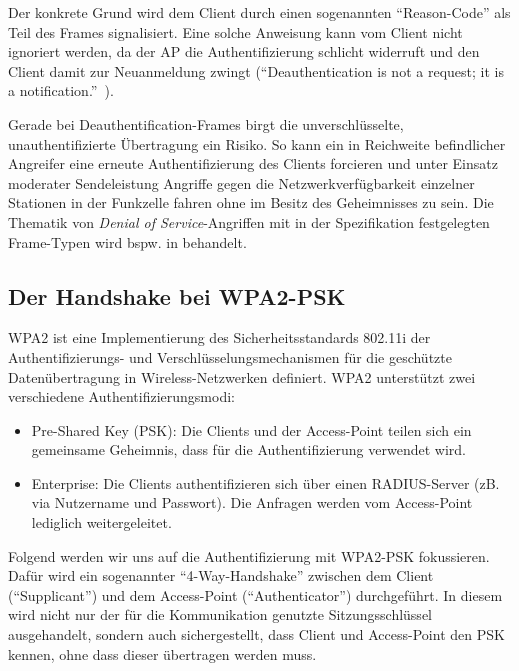 Der konkrete Grund wird dem Client durch einen sogenannten \enquote{Reason-Code} als Teil des Frames signalisiert. Eine solche Anweisung kann vom Client nicht ignoriert werden, da der AP die Authentifizierung schlicht widerruft und den Client damit zur Neuanmeldung zwingt (\enquote{Deauthentication is not a request; it is a notification.}~\cite[S. 74]{ieee802.11}).
 
Gerade bei Deauthentification-Frames birgt die unverschlüsselte, unauthentifizierte Übertragung ein Risiko.
So kann ein in Reichweite befindlicher Angreifer eine erneute Authentifizierung des Clients forcieren und unter Einsatz moderater Sendeleistung Angriffe gegen die Netzwerkverfügbarkeit einzelner Stationen in der Funkzelle fahren ohne im Besitz des Geheimnisses zu sein. Die Thematik von \textit{Denial of Service}-Angriffen mit in der Spezifikation festgelegten Frame-Typen wird bspw. in \cite{bernaschi2008access} behandelt.

\subsection{Der Handshake bei WPA2-PSK}\label{subs:handshake}
WPA2 ist eine Implementierung des Sicherheitsstandards 802.11i der Authentifizierungs- und Verschlüsselungsmechanismen für die geschützte Datenübertragung in Wireless-Netzwerken definiert.
WPA2 unterstützt zwei verschiedene Authentifizierungsmodi: 
\begin{itemize}
	\item Pre-Shared Key (PSK): Die Clients und der Access-Point teilen sich ein gemeinsame Geheimnis, dass für die Authentifizierung verwendet wird.
	\item Enterprise: Die Clients authentifizieren sich über einen RADIUS-Server (zB. via Nutzername und Passwort). Die Anfragen werden vom Access-Point lediglich weitergeleitet.
\end{itemize}
Folgend werden wir uns auf die Authentifizierung mit WPA2-PSK fokussieren.
Dafür wird ein sogenannter \enquote{4-Way-Handshake} zwischen dem Client (\enquote{Supplicant}) und dem Access-Point (\enquote{Authenticator}) durchgeführt.
In diesem wird nicht nur der für die Kommunikation genutzte Sitzungsschlüssel ausgehandelt, sondern auch sichergestellt, dass Client und Access-Point den PSK kennen, ohne dass dieser übertragen werden muss.

